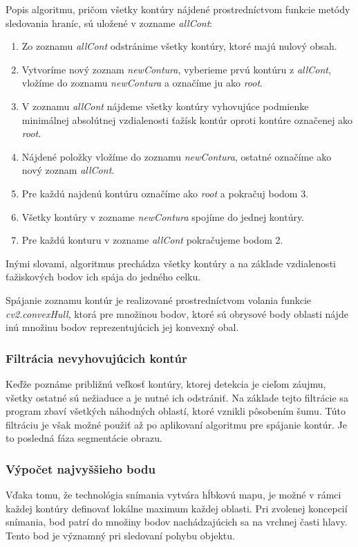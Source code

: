 Popis algoritmu, pričom všetky kontúry nájdené prostredníctvom funkcie metódy sledovania hraníc, sú uložené v zozname \textit{allCont}:
\begin{enumerate}
  \item Zo zoznamu \textit{allCont} odstránime všetky kontúry, ktoré majú nulový obsah.
  \item Vytvoríme nový zoznam \textit{newContura}, vyberieme prvú kontúru z \textit{allCont}, vložíme do zoznamu \textit{newContura} a označíme ju ako \textit{root}.
  \item V zoznamu \textit{allCont} nájdeme všetky kontúry vyhovujúce podmienke minimálnej absolútnej vzdialenosti ťažísk kontúr oproti kontúre označenej ako \textit{root}.
  \item Nájdené položky vložíme do zoznamu \textit{newContura}, ostatné označíme ako nový zoznam
  \textit{allCont}.
  \item Pre každú najdenú kontúru označíme ako \textit{root} a  pokračuj bodom 3.
  \item Všetky kontúry v zozname \textit{newContura} spojíme do jednej kontúry.
  \item Pre každú konturu v zozname \textit{allCont} pokračujeme bodom 2.
  
\end{enumerate}
Inými slovami, algoritmus prechádza všetky kontúry a na základe vzdialenosti ťažiskových bodov ich spája do jedného celku.


Spájanie zoznamu kontúr je realizované prostredníctvom volania funkcie \textit{cv2.convexHull}, ktorá pre množinou bodov, ktoré sú obrysové body oblasti nájde inú množinu bodov reprezentujúcich jej konvexný obal.

\subsubsection{Filtrácia nevyhovujúcich kontúr}  
Keďže poznáme približnú veľkosť kontúry, ktorej detekcia je cieľom záujmu, všetky ostatné sú nežiaduce a je nutné ich odstrániť. Na základe tejto filtrácie sa program zbaví všetkých náhodných oblastí, ktoré vznikli pôsobením šumu. Túto filtráciu je však možné použiť až po aplikovaní algoritmu pre spájanie kontúr. Je to posledná fáza segmentácie obrazu. 

\subsubsection{Výpočet najvyššieho bodu}
Vďaka tomu, že technológia snímania vytvára hĺbkovú mapu, je možné v rámci každej kontúry definovať lokálne maximum každej oblasti. Pri zvolenej koncepcií snímania, bod patrí do množiny bodov nachádzajúcich sa na vrchnej časti hlavy. Tento bod je významný pri sledovaní pohybu objektu. \vspace{5mm}


